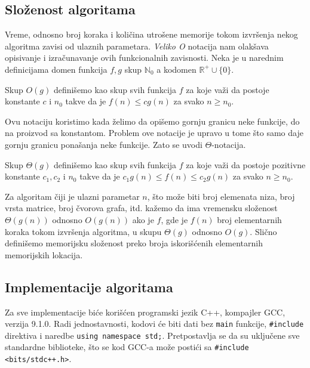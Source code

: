 \subsection{Slo\v zenost algoritama}

Vreme, odnosno broj koraka i koli\v cina utro\v sene memorije tokom izvr\v senja nekog algoritma zavisi od ulaznih parametara. \textit{Veliko O} notacija nam olak\v sava opisivanje i izra\v cunavanje ovih funkcionalnih zavisnosti. Neka je u narednim definicijama domen funkcija $f, g$ skup $\mathbb{N}_0$ a kodomen $\mathbb{R}^{+} \cup \{ 0 \}$.

\begin{dfn}
Skup $O(g)$ defini\v semo kao skup svih funkcija $f$ za koje va\v zi da postoje konstante $c$ i $n_0$ takve da je $f(n) \leq c g(n)$ za svako $n \geq n_0$.
\end{dfn}

Ovu notaciju koristimo kada \v zelimo da opi\v semo gornju granicu neke funkcije, do na proizvod sa konstantom. Problem ove notacije je upravo u tome \v sto samo daje gornju granicu pona\v sanja neke funkcije. Zato se uvodi $\Theta$-notacija.

\begin{dfn}
Skup $\Theta(g)$ defini\v semo kao skup svih funkcija $f$ za koje va\v zi da postoje pozitivne konstante $c_1, c_2$ i $n_0$ takve da je $c_1 g(n) \leq f(n) \leq c_2 g(n)$ za svako $n \geq n_0$.
\end{dfn}

Za algoritam \v ciji je ulazni parametar $n$, \v sto mo\v ze biti broj elemenata niza, broj vrsta matrice, broj \v cvorova grafa, itd. ka\v zemo da ima vremensku slo\v zenost $\Theta(g(n))$ odnosno $O(g(n))$ ako je $f$, gde je $f(n)$ broj elementarnih koraka tokom izvr\v senja algoritma, u skupu $\Theta(g)$ odnosno $O(g)$. Sli\v cno defini\v semo memorijsku slo\v zenost preko broja iskori\v s\' cenih elementarnih memorijskih lokacija.

\subsection{Implementacije algoritama}

Za sve implementacije bi\' ce kori\v s\' cen programski jezik C++, kompajler GCC, verzija 9.1.0. Radi jednostavnosti, kodovi \' ce biti dati bez \texttt{main} funkcije, \texttt{\#include} direktiva i naredbe \texttt{using namespace std;}. Pretpostavlja se da su uklju\v cene sve standardne biblioteke, \v sto se kod GCC-a mo\v ze posti\' ci sa \texttt{\#include <bits/stdc++.h>}.